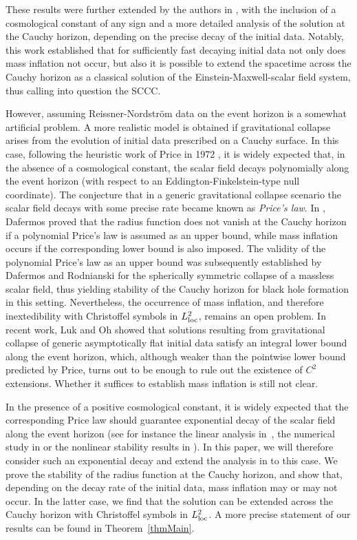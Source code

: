 \documentclass[a4paper,11pt,oneside,reqno]{amsart}
\begin{document}
These results were further extended by the authors in \cite{relIst1, relIst2, relIst3}, with the inclusion of a cosmological constant of any sign and a more detailed analysis of the solution at the Cauchy horizon, depending on the precise decay of the initial data. Notably, this work established that for sufficiently fast decaying initial data not only does mass inflation not occur, but also it is possible to extend the spacetime across the Cauchy horizon as a classical solution of the Einstein-Maxwell-scalar field system, thus calling into question the SCCC.

However, assuming Reissner-Nordstr\"{o}m data on the event horizon is a somewhat artificial problem. A more realistic model is obtained if gravitational collapse arises from the evolution of initial data prescribed on a Cauchy surface. In this case, following the heuristic work of Price in 1972 \cite{Price}, it is widely expected that, in the absence of a cosmological constant, the scalar field decays polynomially along the event horizon (with respect to an Eddington-Finkelstein-type null coordinate). The conjecture that in a generic gravitational collapse scenario the scalar field decays with some precise rate became known as {\em Price's law}. In \cite{Dafermos2}, Dafermos proved that the radius function does not vanish at the Cauchy horizon if a polynomial Price's law is assumed as an upper bound, while mass inflation occurs if the corresponding lower bound is also imposed. The validity of the polynomial Price's law as an upper bound was subsequently established by Dafermos and Rodnianski \cite{DafermosProof} for the spherically symmetric collapse of a massless scalar field, thus yielding stability of the Cauchy horizon for black hole formation in this setting. Nevertheless, the occurrence of mass inflation, and therefore inextedibility with Christoffel symbols in $L^2_{{\rm loc}}$, remains an open problem. In recent work, Luk and Oh \cite{LukOh1, LukOh2} showed that solutions resulting from gravitational collapse of generic asymptotically flat initial data satisfy 
an integral lower bound along the event horizon, which, although weaker than the
pointwise lower bound predicted by Price, turns out to be enough to rule out the
existence of $C^2$ extensions. Whether it suffices to establish mass inflation is
still not clear.

In the presence of a positive cosmological constant, it is widely expected that the corresponding Price law should guarantee exponential decay of the scalar field along the event horizon (see for instance the linear analysis in~\cite{DafermosWavedeSitter, Dyatlov}, the numerical study in \cite{Brady97} or the nonlinear stability results in \cite{HintzVasy}). In this paper, we will therefore consider such an exponential decay and extend the analysis in \cite{relIst1, relIst2, relIst3} to this case. We prove the stability of the radius function at the Cauchy horizon, and show that, depending on the decay rate of the initial data, mass inflation may or may not occur. In the latter case, we find that the solution can be extended across the Cauchy horizon with Christoffel symbols in $L^2_{{\rm loc}}$. A more precise statement of our results can be found in Theorem~\ref{thmMain}.
\end{document}
